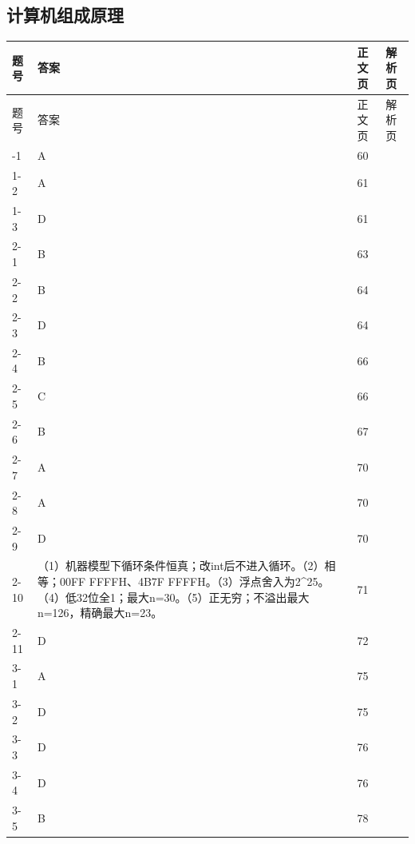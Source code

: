 \documentclass{sidenotes-simplex}
\begin{document}
\subsection*{计算机组成原理}
{\fontsize{9.3}{12}\selectfont
\begin{longtable}{@{}p{18mm}p{87mm}p{20mm}p{20mm}@{}}\toprule 题号 & 答案 & 正文页 & 解析页 \\ \midrule\endfirsthead\toprule 题号 & 答案 & 正文页 & 解析页 \\ \midrule\endhead\bottomrule\endfoot
1-1 & A & 60 & \hyperref[a:CO01-E01]{\pageref*{a:CO01-E01}} \\
1-2 & A & 61 & \hyperref[a:CO01-E02]{\pageref*{a:CO01-E02}} \\
1-3 & D & 61 & \hyperref[a:CO01-E03]{\pageref*{a:CO01-E03}} \\
2-1 & B & 63 & \hyperref[a:CO02-E01]{\pageref*{a:CO02-E01}} \\
2-2 & B & 64 & \hyperref[a:CO02-E02]{\pageref*{a:CO02-E02}} \\
2-3 & D & 64 & \hyperref[a:CO02-E03]{\pageref*{a:CO02-E03}} \\
2-4 & B & 66 & \hyperref[a:CO02-E04]{\pageref*{a:CO02-E04}} \\
2-5 & C & 66 & \hyperref[a:CO02-E05]{\pageref*{a:CO02-E05}} \\
2-6 & B & 67 & \hyperref[a:CO02-E06]{\pageref*{a:CO02-E06}} \\
2-7 & A & 70 & \hyperref[a:CO02-E07]{\pageref*{a:CO02-E07}} \\
2-8 & A & 70 & \hyperref[a:CO02-E08]{\pageref*{a:CO02-E08}} \\
2-9 & D & 70 & \hyperref[a:CO02-E09]{\pageref*{a:CO02-E09}} \\
2-10 & （1）机器模型下循环条件恒真；改int后不进入循环。（2）相等；00FF FFFFH、4B7F FFFFH。（3）浮点舍入为2\^{}25。（4）低32位全1；最大n=30。（5）正无穷；不溢出最大n=126，精确最大n=23。 & 71 & \hyperref[a:CO02-E10]{\pageref*{a:CO02-E10}} \\
2-11 & D & 72 & \hyperref[a:CO02-E11]{\pageref*{a:CO02-E11}} \\
3-1 & A & 75 & \hyperref[a:CO03-E01]{\pageref*{a:CO03-E01}} \\
3-2 & D & 75 & \hyperref[a:CO03-E02]{\pageref*{a:CO03-E02}} \\
3-3 & D & 76 & \hyperref[a:CO03-E03]{\pageref*{a:CO03-E03}} \\
3-4 & D & 76 & \hyperref[a:CO03-E04]{\pageref*{a:CO03-E04}} \\
3-5 & B & 78 & \hyperref[a:CO03-E05]{\pageref*{a:CO03-E05}} \\

\end{longtable}}
\end{document}
